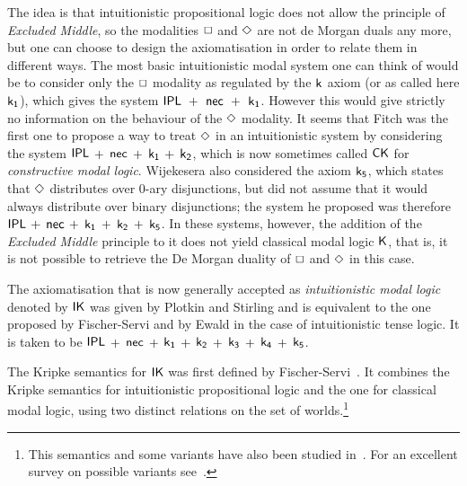 The idea is that intuitionistic propositional logic does not allow the principle of \emph{Excluded Middle}, so the modalities $\BOX$ and $\DIA$ are not de Morgan duals any more, but one can choose to design the axiomatisation in order to relate them in different ways. The most basic intuitionistic modal system one can think of would be to consider only the $\BOX$ modality as regulated by the $\kax$ axiom (or as called here $\kax[1]$), which gives the system \hbox{$\rn{IPL}$ $\rn{+}$ $\rn{nec}$ $\rn{+}$ $\kax[1]$}. However this would give strictly no information on the behaviour of the $\DIA$ modality.
It seems that Fitch \cite{fitch:pm48} was the first one to propose a way to treat $\DIA$ in an intuitionistic system by considering the system  $\rn{IPL}$ $\rn{+}$ $\rn{nec}$ $\rn{+}$ $\kax[1]$ $\rn{+}$ $\kax[2]$, which is now sometimes called $\rn{CK}$ for \emph{constructive modal logic}. Wijekesera \cite{wijesekera:apal90} also considered the axiom $\kax[5]$, which states that $\DIA$ distributes over 0-ary disjunctions, but did not assume that it would always distribute over binary disjunctions; the system he proposed was therefore  $\rn{IPL}$ $\rn{+}$ $\rn{nec}$ $\rn{+}$ $\kax[1]$ $\rn{+}$ $\kax[2]$  $\rn{+}$ $\kax[5]$. In these systems, however, the addition of the \emph{Excluded Middle} principle to it does not yield classical modal logic $\K$, that is, it is not possible to retrieve the De Morgan duality of $\BOX$ and $\DIA$ in this case.

The axiomatisation that is now generally accepted as \emph{intuitionistic modal logic} denoted by $\IK$ was given by Plotkin and Stirling \cite{plotkin:stirling:86} and is equivalent to the one proposed by Fischer-Servi \cite{fischer-servi:84} and by Ewald \cite{ewald:jsl86} in the case of intuitionistic tense logic. It is taken to be    $\rn{IPL}$ $\rn{+}$ $\rn{nec}$ $\rn{+}$ $\kax[1]$ $\rn{+}$ $\kax[2]$ $\rn{+}$ $\kax[3]$ $\rn{+}$ $\kax[4]$  $\rn{+}$ $\kax[5]$.


The Kripke semantics for $\IK$ was first defined by Fischer-Servi~\cite{fischer-servi:84}.
%
It combines the Kripke semantics for intuitionistic propositional logic and the one for classical modal logic, using two distinct relations on the set of worlds.\footnote{This semantics and some variants have also been studied in~\cite{bovzic1984models}. For an excellent survey on possible variants see~\cite{simpson:phd}.} 

